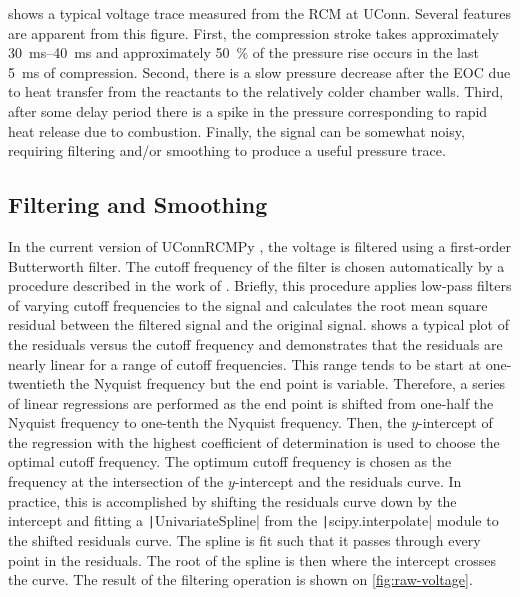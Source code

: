 \documentclass[12pt]{../ussci}
\begin{document}
 shows a typical voltage trace measured from the RCM at
UConn. Several features are apparent from this figure. First, the compression
stroke takes approximately \SIrange{30}{40}{\ms} and approximately
\SI{50}{\percent} of the pressure rise occurs in the last \SI{5}{\ms} of
compression. Second, there is a slow pressure decrease after the EOC due to
heat transfer from the reactants to the relatively colder chamber walls. Third,
after some delay period there is a spike in the pressure corresponding to rapid
heat release due to combustion. Finally, the signal can be somewhat noisy,
requiring filtering and/or smoothing to produce a useful pressure trace.

\subsection{Filtering and Smoothing}\label{filtering-and-smoothing}

In the current version of UConnRCMPy \autocite{uconnrcmpy}, the voltage is
filtered using a first-order Butterworth filter. The cutoff frequency of the
filter is chosen automatically by a procedure described in the work of
\textcite{Yu1999}. Briefly, this procedure applies low-pass filters of
varying cutoff frequencies to the signal and calculates the root mean square
residual between the filtered signal and the original signal.
 shows a typical plot of the residuals versus the cutoff
frequency and demonstrates that the residuals are nearly linear for a range of
cutoff frequencies. This range tends to be start at one-twentieth the Nyquist
frequency but the end point is variable. Therefore, a series of linear
regressions are performed as the end point is shifted from one-half the
Nyquist frequency to one-tenth the Nyquist frequency. Then, the $y$-intercept
of the regression with the highest coefficient of determination is used to
choose the optimal cutoff frequency. The optimum cutoff frequency is chosen as
the frequency at the intersection of the $y$-intercept and the residuals curve.
In practice, this is accomplished by shifting the residuals curve down
by the intercept and fitting a \texttt|UnivariateSpline| from the
\texttt|scipy.interpolate| module \autocite{Jones2001} to the
shifted residuals curve. The spline is fit such that it passes through every
point in the residuals. The root of the spline is then where the intercept
crosses the curve. The result of the filtering operation is shown on
\cref{fig:raw-voltage}.
\end{document}
